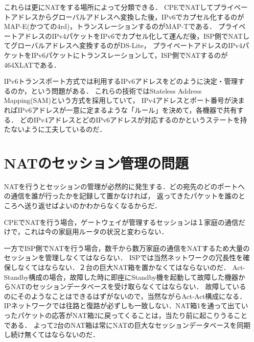 これらは更にNATをする場所によって分類できる．
CPEでNATしてプライベートアドレスからグローバルアドレスへ変換した後，IPv6でカプセル化するのがMAP-E(かつての4rd)，トランスレーションするのがMAP-Tである．
プライベートアドレスのIPv4パケットをIPv6でカプセル化して運んだ後，ISP側でNATしてグローバルアドレスへ変換するのがDS-Lite，
プライベートアドレスのIPv4パケットをIPv6パケットにトランスレーションして，ISP側でNATするのが464XLATである．

IPv6トランスポート方式では利用するIPv6アドレスをどのように決定・管理するのか，という問題がある．
これらの技術ではStateless Address Mapping(SAM)という方式を採用していて，
IPv4アドレスとポート番号が決まればIPv6アドレスが一意に定まるような「ルール」を決めて，各機器で共有する．
どのIPv4アドレスとどのIPv6アドレスが対応するのかというステートを持たないように工夫しているのだ．

\section{NATのセッション管理の問題}

NATを行うとセッションの管理が必然的に発生する．どの宛先のどのポートへの通信を誰が行ったかを記録して置かなければ，
返ってきたパケットを誰のところへ送り返せばよいのかわからなくなるからだ．

CPEでNATを行う場合，ゲートウェイが管理するセッションは１家庭の通信だけで，これは今の家庭用ルータの状況と変わらない．

一方でISP側でNATを行う場合，数千から数万家庭の通信をNATするため大量のセッションを管理しなくてはならない．
ISPでは当然ネットワークの冗長性を確保しなくてはならない．２台の巨大NAT箱を置かなくてはならないのだ．
Act-Standby構成の場合，故障した時に即座にStandby機を起動して故障した機器からNATのセッションデータベースを受け取らなくてはならない．
故障しているのにそのようなことはできるはずがないので，当然ながらAct-Act構成になる．
IPネットワークでは往路と復路が必ずしも一致しない．NAT箱1を通って出ていったパケットの応答がNAT箱2に戻ってくることは，当たり前に起こりうることである．
よって2台のNAT箱は常にNATの巨大なセッションデータベースを同期し続け無くてはならないのだ．


